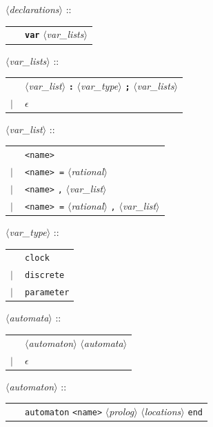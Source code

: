 \documentclass[a4paper,11pt]{report}
\newcommand{\emptystring}{$\epsilon$}
\newcommand{\nt}[1]{$\langle$\emph{#1}$\rangle$}
\newcommand{\regleGrammaire}[1]{\bigskip \noindent \nt{#1} :: \\}
\newcommand{\code}[1]{\textbf{\texttt{#1}}}
\newcommand{\styleIMI}[1]{\textcolor{imicolor}{\texttt{#1}}}
\begin{document}
\regleGrammaire{declarations}
\begin{tabular}{l l}
	\  & \code{var} \nt{var\_lists} \\
\end{tabular}

\regleGrammaire{var\_lists}
\begin{tabular}{l l}
	\  & \nt{var\_list} \code{:} \nt{var\_type} \code{;} \nt{var\_lists} \\
	$|$ & \emptystring
\end{tabular}

\regleGrammaire{var\_list}
\begin{tabular}{l l}
	\  & \styleIMI{<name>} \\
	$|$ & \styleIMI{<name> =} \nt{rational} \\
	$|$ & \styleIMI{<name>} \styleIMI{,} \nt{var\_list}\\
	$|$ & \styleIMI{<name> =} \nt{rational} \styleIMI{,} \nt{var\_list}\\
\end{tabular}

\regleGrammaire{var\_type}
\begin{tabular}{l l}
	\  & \styleIMI{clock} \\
	$|$ & \styleIMI{discrete} \\
	$|$ & \styleIMI{parameter} \\
\end{tabular}

\regleGrammaire{automata}
\begin{tabular}{l l}
	\  & \nt{automaton} \nt{automata} \\
	$|$ & \emptystring \\
\end{tabular}

\regleGrammaire{automaton}
\begin{tabular}{l l}
	\  & \styleIMI{automaton} \styleIMI{<name>} \nt{prolog} \nt{locations} \styleIMI{end} \\
\end{tabular}
\end{document}
